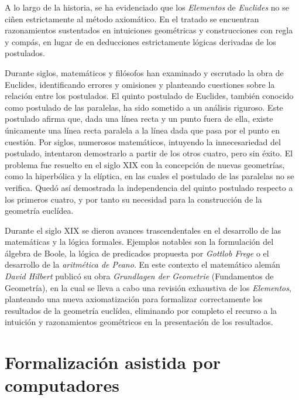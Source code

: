 A lo largo de la historia, se ha evidenciado que los \textit{Elementos} de
\textit{Euclides} no se ciñen estrictamente al método axiomático. En el tratado
se encuentran razonamientos sustentados en intuiciones geométricas y
construcciones con regla y compás, en lugar de en deducciones estrictamente
lógicas derivadas de los postulados.

Durante siglos, matemáticos y filósofos han examinado y escrutado la obra de
Euclides, identificando errores y omisiones y planteando cuestiones sobre la
relación entre los postulados. El quinto postulado de Euclides, también conocido
como postulado de las paralelas, ha sido sometido a un análisis riguroso. Este
postulado afirma que, dada una línea recta y un punto fuera de ella, existe
únicamente una línea recta paralela a la línea dada que pasa por el punto en
cuestión. Por siglos, numerosos matemáticos, intuyendo la innecesariedad del
postulado, intentaron demostrarlo a partir de los otros cuatro, pero sin éxito.
El problema fue resuelto en el siglo XIX con la concepción de nuevas geometrías,
como la hiperbólica y la elíptica, en las cuales el postulado de las paralelas
no se verifica. Quedó así demostrada la independencia del quinto postulado
respecto a los primeros cuatro, y por tanto su necesidad para la construcción de
la geometría euclídea.

Durante el siglo XIX se dieron avances trascendentales en el desarrollo de las
matemáticas y la lógica formales. Ejemplos notables son la
formulación del álgebra de Boole, la lógica de predicados propuesta por
\textit{Gottlob Frege} o el desarrollo de la \textit{aritmética de Peano}.
En este contexto el matemático alemán \textit{David Hilbert} publicó su obra
\textit{Grundlagen der Geometrie} (Fundamentos de Geometría), en la cual se
lleva a cabo una revisión exhaustiva de los \textit{Elementos}, planteando una
nueva axiomatización para formalizar correctamente los resultados de la
geometría euclídea, eliminando por completo el recurso a la intuición y
razonamientos geométricos en la presentación de los resultados.



\section{Formalización asistida por computadores}

